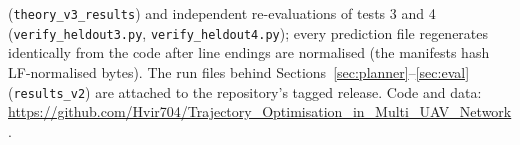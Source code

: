 \documentclass[journal,outdir=./]{IEEEtran}
\begin{document}
(\texttt{theory\_v3\_results}) and independent re-evaluations of tests 3 and 4 (\texttt{verify\_heldout3.py}, \texttt{verify\_heldout4.py}); every prediction file regenerates identically from the code after line endings are normalised (the manifests hash LF-normalised bytes). The run files behind Sections~\ref{sec:planner}--\ref{sec:eval} (\texttt{results\_v2}) are attached to the repository's tagged release. Code and data: \url{https://github.com/Hvir704/Trajectory_Optimisation_in_Multi_UAV_Network}.



\end{document}
